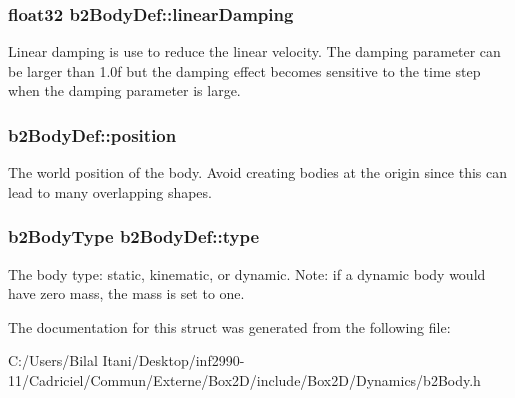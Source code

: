\subsubsection[{\texorpdfstring{linear\+Damping}{linearDamping}}]{\setlength{\rightskip}{0pt plus 5cm}float32 b2\+Body\+Def\+::linear\+Damping}\hypertarget{structb2_body_def_a728f6df3be7dedb331455105e3659d46}{}\label{structb2_body_def_a728f6df3be7dedb331455105e3659d46}
Linear damping is use to reduce the linear velocity. The damping parameter can be larger than 1.\+0f but the damping effect becomes sensitive to the time step when the damping parameter is large. 
\subsubsection[{\texorpdfstring{position}{position}}]{ b2\+Body\+Def\+::position}\hypertarget{structb2_body_def_a680cadc09ad6cf4b3366cbf0914c648b}{}\label{structb2_body_def_a680cadc09ad6cf4b3366cbf0914c648b}
The world position of the body. Avoid creating bodies at the origin since this can lead to many overlapping shapes. 
\subsubsection[{\texorpdfstring{type}{type}}]{\setlength{\rightskip}{0pt plus 5cm}b2\+Body\+Type b2\+Body\+Def\+::type}\hypertarget{structb2_body_def_a89cc3ad1873908042b002147b3861381}{}\label{structb2_body_def_a89cc3ad1873908042b002147b3861381}
The body type\+: static, kinematic, or dynamic. Note\+: if a dynamic body would have zero mass, the mass is set to one. 

The documentation for this struct was generated from the following file\+:\begin{DoxyCompactItemize}
\item 
C\+:/\+Users/\+Bilal Itani/\+Desktop/inf2990-\/11/\+Cadriciel/\+Commun/\+Externe/\+Box2\+D/include/\+Box2\+D/\+Dynamics/b2\+Body.\+h\end{DoxyCompactItemize}
